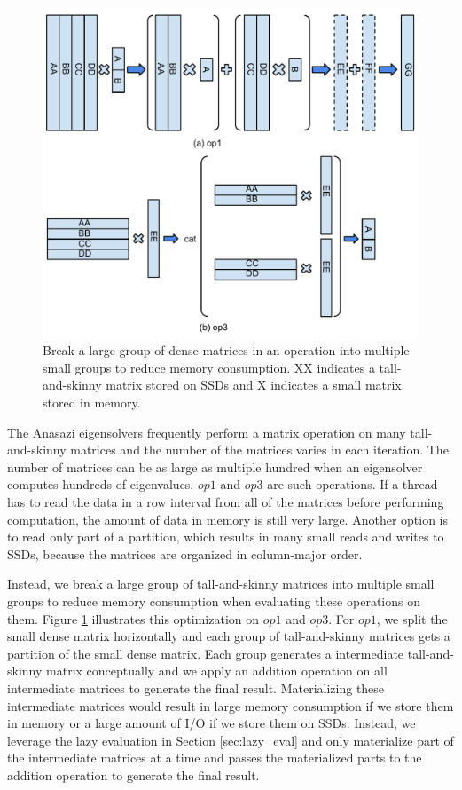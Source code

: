 \begin{figure}
\centering
\includegraphics[scale=0.4]{./mat_group.pdf}
\vspace{-5pt}
\caption{Break a large group of dense matrices in an operation into multiple
small groups to reduce memory consumption. XX indicates a tall-and-skinny matrix
stored on SSDs and X indicates a small matrix stored in memory.}
\vspace{-5pt}
\label{fig:mat_group}
\end{figure}

The Anasazi eigensolvers frequently perform a matrix operation on many
tall-and-skinny matrices and the number of the matrices varies in each iteration.
The number of matrices can be as large as multiple hundred when an eigensolver
computes hundreds of eigenvalues. $op1$ and $op3$ are such operations.
If a thread has to read the data in a row interval from all of the matrices
before performing computation,
the amount of data in memory is still very large. Another option is to read
only part of a partition, which results in many small reads and writes to SSDs,
because the matrices are organized in column-major order.

Instead, we break a large group of tall-and-skinny matrices into multiple small
groups to reduce
memory consumption when evaluating these operations on them. Figure
\ref{fig:mat_group} illustrates this optimization on $op1$ and $op3$. For $op1$,
we split the small dense matrix horizontally and each group of tall-and-skinny
matrices gets a partition of the small dense matrix. Each group generates
a intermediate tall-and-skinny matrix conceptually and we apply an addition
operation on all intermediate matrices to generate the final result.
Materializing these
intermediate matrices would result in large memory consumption if we store them
in memory or a large amount of I/O if we store them on SSDs. Instead, we leverage
the lazy evaluation in Section \ref{sec:lazy_eval} and only materialize part of
the intermediate matrices at a time and passes the materialized parts to
the addition operation to generate the final result.

